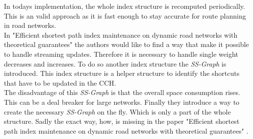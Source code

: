 \documentclass[twocolumn]{article}
\begin{document}
In todays implementation, the whole
index structure is recomputed periodically. This is an valid approach as it is fast enough
to stay accurate for route planning in road networks.
\\
In "Efficient shortest path index maintenance on dynamic road networks with theoretical guarantees" \cite{Ouyang2020} the authors would like to find a way that make it possible to handle streaming
updates. Therefore it is necessary to handle single weight decreases
and increases. To do so another index structure the \textit{SS-Graph} is introduced.
This index structure is a helper structure to identify the shortcuts
that have to be updated in the CCH.
\\
The disadvantage of this \textit{SS-Graph} is that the overall space consumption rises.
This can be a deal breaker for large networks.
Finally they introduce a way to create the necessary \textit{SS-Graph} on the fly. Which
is only a part of the whole structure.
Sadly the exact way, how, is missing in the paper "Efficient shortest path index maintenance on dynamic road networks with theoretical guarantees" \cite{Ouyang2020}.




 
\end{document}
